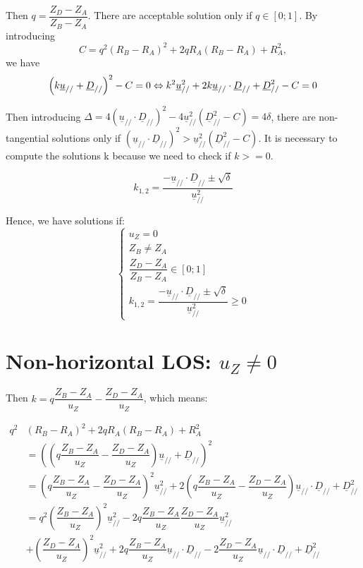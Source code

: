 \documentclass[a4paper,11pt,twoside,titlepage,openright]{book}
\numberwithin{equation}{section}
\newcommand{\ud}[1]{\underline{#1}}
\begin{document}
Then $q=\dfrac{Z_D-Z_A}{Z_B-Z_A}$.
There are acceptable solution only if $q\in[0;1]$.
By introducing $$C = q^2(R_B-R_A)^2 + 2qR_A(R_B-R_A) + R_A^2,$$ we have
$$
\left(k\ud{u}_{//} + \ud{D}_{//}\right)^2 - C = 0\\
\Leftrightarrow k^2\ud{u}_{//}^2 + 2k\ud{u}_{//}\cdot\ud{D}_{//} + \ud{D}_{//}^2-C = 0
$$

Then introducing $\Delta = 4\left(\ud{u}_{//}\cdot\ud{D}_{//}\right)^2 - 4\ud{u}_{//}^2\left(\ud{D}_{//}^2-C\right) = 4\delta$, there are non-tangential solutions only if $\left(\ud{u}_{//}\cdot\ud{D}_{//}\right)^2 >\ud{u}_{//}^2\left(\ud{D}_{//}^2-C\right)$.
It is necessary to compute the solutions k because we need to check if $k>=0$.

$$
k_{1,2} = \dfrac{-\ud{u}_{//}\cdot\ud{D}_{//} \pm \sqrt{\delta}}{\ud{u}_{//}^2}
$$

Hence, we have solutions if:
$$
\left\{
\begin{array}{lll}
u_Z = 0\\
Z_B\neq Z_A\\
\dfrac{Z_D-Z_A}{Z_B-Z_A} \in [0;1]\\
k_{1,2} = \dfrac{-\ud{u}_{//}\cdot\ud{D}_{//} \pm \sqrt{\delta}}{\ud{u}_{//}^2} \geq 0
\end{array}
\right.
$$

\section{Non-horizontal LOS: $u_Z\neq0$}

Then $k=q\dfrac{Z_B-Z_A}{u_Z} - \dfrac{Z_D-Z_A}{u_Z}$, which means:


$$
\begin{array}{lll}
q^2 & (R_B-R_A)^2 + 2qR_A(R_B-R_A) + R_A^2\\
& =\left(\left(q\dfrac{Z_B-Z_A}{u_Z} - \dfrac{Z_D-Z_A}{u_Z}\right)\ud{u}_{//} + \ud{D}_{//}\right)^2\\
& = \left(q\dfrac{Z_B-Z_A}{u_Z} - \dfrac{Z_D-Z_A}{u_Z}\right)^2\ud{u}_{//}^2 + 2\left(q\dfrac{Z_B-Z_A}{u_Z} - \dfrac{Z_D-Z_A}{u_Z}\right)\ud{u}_{//}\cdot\ud{D}_{//} + \ud{D}_{//}^2\\
& =q^2\left(\dfrac{Z_B-Z_A}{u_Z}\right)^2\ud{u}_{//}^2 - 2q\dfrac{Z_B-Z_A}{u_Z}\dfrac{Z_D-Z_A}{u_Z}\ud{u}_{//}^2 \\
& + \left(\dfrac{Z_D-Z_A}{u_Z}\right)^2\ud{u}_{//}^2
+ 2q\dfrac{Z_B-Z_A}{u_Z}\ud{u}_{//}\cdot\ud{D}_{//} - 2\dfrac{Z_D-Z_A}{u_Z}\ud{u}_{//}\cdot\ud{D}_{//} + \ud{D}_{//}^2\\
\end{array}
$$
\end{document}
